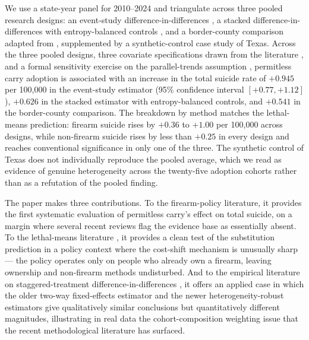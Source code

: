 \documentclass[12pt]{article}
\begin{document}
We use a state-year panel for 2010--2024 and triangulate across
three pooled research designs: an event-study
difference-in-differences \citep{callaway2021}, a stacked
difference-in-differences with entropy-balanced controls
\citep{cengiz2019, hainmueller2012}, and a border-county
comparison adapted from \citet{dube2010}, supplemented by a
synthetic-control case study of Texas. Across the three pooled
designs, three covariate specifications drawn from the literature
\citep{donohue2019, anejadonohuezhang2014, simonsohn2020}, and a
formal sensitivity exercise on the parallel-trends assumption
\citep{rambachan2023}, permitless carry adoption is associated with
an increase in the total suicide rate of $+0.945$ per 100,000 in
the event-study estimator (95\% confidence interval $[+0.77,
+1.12]$), $+0.626$ in the stacked estimator with entropy-balanced
controls, and $+0.541$ in the border-county comparison. The
breakdown by method matches the lethal-means prediction: firearm
suicide rises by $+0.36$ to $+1.00$ per 100,000 across designs,
while non-firearm suicide rises by less than $+0.25$ in every
design and reaches conventional significance in only one of the
three. The synthetic control of Texas does not individually
reproduce the pooled average, which we read as evidence of genuine
heterogeneity across the twenty-five adoption cohorts rather than
as a refutation of the pooled finding.

The paper makes three contributions. To the firearm-policy
literature, it provides the first systematic evaluation of
permitless carry's effect on total suicide, on a margin where
several recent reviews \citep{rand2024, leefirearm2017,
santaella2016} flag the evidence base as essentially absent. To
the lethal-means literature \citep{millerhemenway1999, miller2002a,
miller2012, crifasi2015, kivisto2018, swanson2017, ludwigcook2000},
it provides a clean test of the substitution prediction in a
policy context where the cost-shift mechanism is unusually
sharp --- the policy operates only on people who already own a
firearm, leaving ownership and non-firearm methods undisturbed.
And to the empirical literature on staggered-treatment
difference-in-differences \citep{callaway2021, sunabraham2021,
borusyak2024, dechaisemartin2020, goodmanbacon2021}, it offers an
applied case in which the older two-way fixed-effects estimator
and the newer heterogeneity-robust estimators give qualitatively
similar conclusions but quantitatively different magnitudes,
illustrating in real data the cohort-composition weighting issue
that the recent methodological literature has surfaced.
\end{document}
